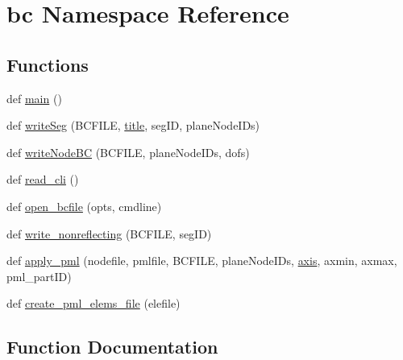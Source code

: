 \hypertarget{namespacebc}{}\section{bc Namespace Reference}
\label{namespacebc}
\subsection*{Functions}
\begin{DoxyCompactItemize}
\item 
def \hyperlink{namespacebc_a4cf71b4bbc84d23159eba5f59bf178f5}{main} ()
\item 
def \hyperlink{namespacebc_a35463a7b582e5de1b1a3c5ae9d34d913}{write\+Seg} (B\+C\+F\+I\+L\+E, \hyperlink{makeLoadsTemps_8m_aacb2c4fc9674678831924fefe696c2de}{title}, seg\+I\+D, plane\+Node\+I\+Ds)
\item 
def \hyperlink{namespacebc_af21ebde085be8d5b7fb326da58fc415c}{write\+Node\+B\+C} (B\+C\+F\+I\+L\+E, plane\+Node\+I\+Ds, dofs)
\item 
def \hyperlink{namespacebc_aec781928da985d56a69074db81974832}{read\+\_\+cli} ()
\item 
def \hyperlink{namespacebc_a5d1d6a658e5c54ce844670ce25456c44}{open\+\_\+bcfile} (opts, cmdline)
\item 
def \hyperlink{namespacebc_a3060f97f6ab0c3cc2c9e4a69dcf6858a}{write\+\_\+nonreflecting} (B\+C\+F\+I\+L\+E, seg\+I\+D)
\item 
def \hyperlink{namespacebc_ab4afd9429871367fa18a9fc90d64327a}{apply\+\_\+pml} (nodefile, pmlfile, B\+C\+F\+I\+L\+E, plane\+Node\+I\+Ds, \hyperlink{extractAxisIntensity_8m_accc088009d44c521706aa98d6387ee21}{axis}, axmin, axmax, pml\+\_\+part\+I\+D)
\item 
def \hyperlink{namespacebc_aea70fa7870b98d12de76eef412858025}{create\+\_\+pml\+\_\+elems\+\_\+file} (elefile)
\end{DoxyCompactItemize}


\subsection{Function Documentation}
\hypertarget{namespacebc_ab4afd9429871367fa18a9fc90d64327a}{}
